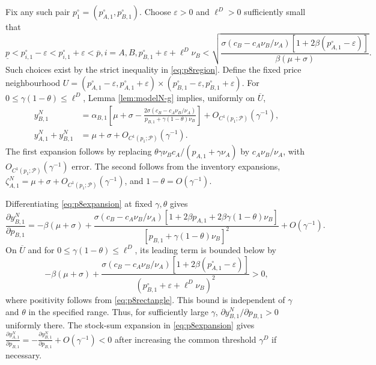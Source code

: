 \documentclass[nonblindrev,copyedit]{informs1}
\begin{document}
\begin{APPENDICES}
Fix any such pair $p_1^\circ=(p_{A,1}^\circ,p_{B,1}^\circ)$. Choose $\varepsilon>0$ and $\ell^D>0$ sufficiently small that
\begin{equation}
\underline{p}<p_{i,1}^\circ-\varepsilon<p_{i,1}^\circ+\varepsilon<\overline{p},i=A,B,
p_{B,1}^\circ+\varepsilon+\ell^D\nu_B < \sqrt{\frac{\sigma(c_B-c_A\nu_B/\nu_A)[1+2\beta(p_{A,1}^\circ-\varepsilon)]}{\beta(\mu+\sigma)}} .
\label{eq:p8rectangle}
\end{equation}
Such choices exist by the strict inequality in \eqref{eq:p8region}. Define the fixed price neighbourhood $U= (p_{A,1}^\circ-\varepsilon,p_{A,1}^\circ+\varepsilon) \times (p_{B,1}^\circ-\varepsilon,p_{B,1}^\circ+\varepsilon)$. For $0\leq\gamma(1-\theta)\leq\ell^D$, Lemma \ref{lem:modelN-g} implies, uniformly on $\overline{U}$,
\begin{equation}
\begin{aligned}
y_{B,1}^N &=\alpha_{B,1}\left[ \mu+\sigma- \frac{2\sigma(c_B-c_A\nu_B/\nu_A)} {p_{B,1}+\gamma(1-\theta)\nu_B}\right] +O_{C^1(p_1;\mathcal{P})}(\gamma^{-1}),\\
y_{A,1}^N+y_{B,1}^N &=\mu+\sigma+O_{C^1(p_1;\mathcal{P})}(\gamma^{-1}).
\end{aligned}
\label{eq:p8expansion}
\end{equation}
The first expansion follows by replacing $\theta\gamma\nu_Bc_A/(p_{A,1}+\gamma\nu_A)$ by $c_A\nu_B/\nu_A$, with $O_{C^1(p_1;\mathcal{P})}(\gamma^{-1})$ error. The second follows from the inventory expansions, $\zeta_{A,1}^{N}=\mu+\sigma+O_{C^1(p_1;\mathcal{P})}(\gamma^{-1})$, and $1-\theta=O(\gamma^{-1})$.

Differentiating \eqref{eq:p8expansion} at fixed $\gamma,\theta$ gives
\begin{equation}
\frac{\partial y_{B,1}^N}{\partial p_{B,1}} =-\beta(\mu+\sigma) +\frac{\sigma(c_B-c_A\nu_B/\nu_A)[1+2\beta p_{A,1}+2\beta\gamma(1-\theta)\nu_B]}{[p_{B,1}+\gamma(1-\theta)\nu_B]^2} +O(\gamma^{-1}).
\label{eq:p8derivative}
\end{equation}
On $\overline{U}$ and for $0\leq\gamma(1-\theta)\leq\ell^D$, its leading term is bounded below by
\[
-\beta(\mu+\sigma) +\frac{\sigma(c_B-c_A\nu_B/\nu_A)[1+2\beta(p_{A,1}^\circ-\varepsilon)]}{(p_{B,1}^\circ+\varepsilon+\ell^D\nu_B)^2}>0,
\]
where positivity follows from \eqref{eq:p8rectangle}. This bound is independent of $\gamma$ and $\theta$ in the specified range. Thus, for sufficiently large $\gamma$, $\partial y_{B,1}^N/\partial p_{B,1}>0$ uniformly there. The stock-sum expansion in \eqref{eq:p8expansion} gives $\frac{\partial y_{A,1}^N}{\partial p_{B,1}} =-\frac{\partial y_{B,1}^N}{\partial p_{B,1}}+O(\gamma^{-1})<0$ after increasing the common threshold $\gamma^D$ if necessary.


\end{APPENDICES}
\end{document}

